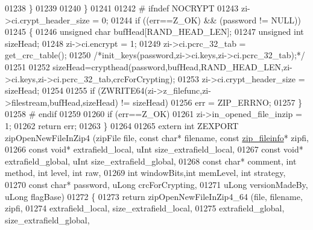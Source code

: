 \begin{DoxyCode}
01238         \}
01239 
01240     \}
01241 
01242 \textcolor{preprocessor}{#    ifndef NOCRYPT}
01243     zi->ci.crypt\_header\_size = 0;
01244     \textcolor{keywordflow}{if} ((err==Z\_OK) && (password != NULL))
01245     \{
01246         \textcolor{keywordtype}{unsigned} \textcolor{keywordtype}{char} bufHead[RAND\_HEAD\_LEN];
01247         \textcolor{keywordtype}{unsigned} \textcolor{keywordtype}{int} sizeHead;
01248         zi->ci.encrypt = 1;
01249         zi->ci.pcrc\_32\_tab = get\_crc\_table();
01250         \textcolor{comment}{/*init\_keys(password,zi->ci.keys,zi->ci.pcrc\_32\_tab);*/}
01251 
01252         sizeHead=crypthead(password,bufHead,RAND\_HEAD\_LEN,zi->ci.keys,zi->ci.pcrc\_32\_tab,crcForCrypting);
01253         zi->ci.crypt\_header\_size = sizeHead;
01254 
01255         \textcolor{keywordflow}{if} (ZWRITE64(zi->z\_filefunc,zi->filestream,bufHead,sizeHead) != sizeHead)
01256                 err = ZIP\_ERRNO;
01257     \}
01258 \textcolor{preprocessor}{#    endif}
01259 
01260     \textcolor{keywordflow}{if} (err==Z\_OK)
01261         zi->in\_opened\_file\_inzip = 1;
01262     \textcolor{keywordflow}{return} err;
01263 \}
01264 
01265 \textcolor{keyword}{extern} \textcolor{keywordtype}{int} ZEXPORT zipOpenNewFileInZip4 (zipFile file, \textcolor{keyword}{const} \textcolor{keywordtype}{char}* filename, \textcolor{keyword}{const} 
      \hyperlink{structzip__fileinfo}{zip\_fileinfo}* zipfi,
01266                                          \textcolor{keyword}{const} \textcolor{keywordtype}{void}* extrafield\_local, uInt size\_extrafield\_local,
01267                                          \textcolor{keyword}{const} \textcolor{keywordtype}{void}* extrafield\_global, uInt size\_extrafield\_global,
01268                                          \textcolor{keyword}{const} \textcolor{keywordtype}{char}* comment, \textcolor{keywordtype}{int} method, \textcolor{keywordtype}{int} level, \textcolor{keywordtype}{int} raw,
01269                                          \textcolor{keywordtype}{int} windowBits,\textcolor{keywordtype}{int} memLevel, \textcolor{keywordtype}{int} strategy,
01270                                          \textcolor{keyword}{const} \textcolor{keywordtype}{char}* password, uLong crcForCrypting,
01271                                          uLong versionMadeBy, uLong flagBase)
01272 \{
01273     \textcolor{keywordflow}{return} zipOpenNewFileInZip4\_64 (file, filename, zipfi,
01274                                  extrafield\_local, size\_extrafield\_local,
01275                                  extrafield\_global, size\_extrafield\_global,

\end{DoxyCode}
